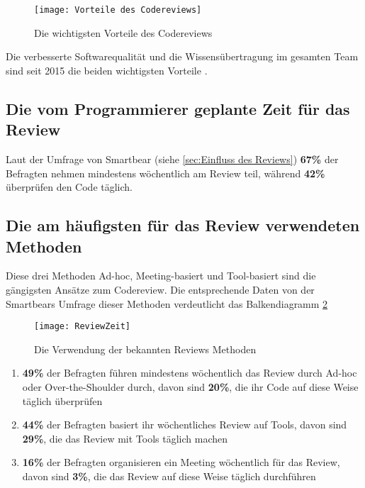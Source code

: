 \begin{figure}[H]
	\centering
	\texttt{[image: Vorteile des Codereviews]}
	\caption[Vorteile des Codereviews]{Die wichtigsten Vorteile des Codereviews\\ \cite{smartbear}}
	\label{fig:Vorteile des Codereviews}
\end{figure}

Die verbesserte Softwarequalität und die Wissensübertragung im gesamten Team sind seit 2015 die beiden wichtigsten Vorteile \cite{smartbear}.

\subsection{Die vom Programmierer geplante Zeit für das Review}
\label{subsec:reviewerZeit}

Laut der Umfrage von Smartbear (siehe \cref{sec:Einfluss des Reviews}) \textbf{67\%} der Befragten nehmen mindestens wöchentlich am Review teil, während \textbf{42\%} überprüfen den Code täglich.

\subsection{Die am häufigsten für das Review verwendeten Methoden}
\label{subsec:Die am häufigsten verwendete Methoden}

Diese drei Methoden Ad-hoc, Meeting-basiert und Tool-basiert sind die gängigsten Ansätze zum Codereview.
Die entsprechende Daten von der Smartbears Umfrage \cite{smartbear} dieser Methoden verdeutlicht das Balkendiagramm \cref{fig:ReviewZeit} 

\begin{figure}[H]
	\centering
	\texttt{[image: ReviewZeit]}
	\caption[Die Verwendung der bekannten Reviews Methoden]{Die Verwendung der bekannten Reviews Methoden\\\cite{smartbear}}
	\label{fig:ReviewZeit}
\end{figure}

\begin{enumerate}
	\item \textbf{49\%} der Befragten führen mindestens wöchentlich das Review durch Ad-hoc oder Over-the-Shoulder durch, davon sind \textbf{20\%}, die ihr Code auf diese Weise 					täglich überprüfen
	\item \textbf{44\%} der Befragten basiert ihr wöchentliches Review auf Tools, davon sind \textbf{29\%}, die das Review mit Tools täglich machen
	\item \textbf{16\%} der Befragten organisieren ein Meeting wöchentlich für das Review, davon sind \textbf{3\%}, die das Review auf diese Weise täglich durchführen
\end{enumerate}

